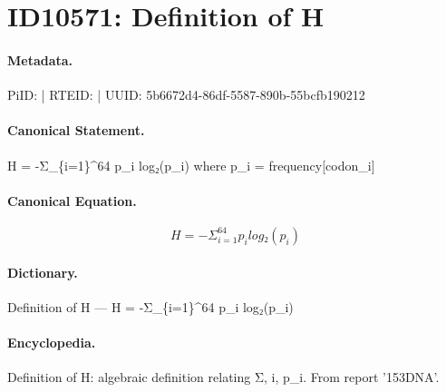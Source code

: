 \section*{ID10571: Definition of H}
\paragraph{Metadata.}
PiID:  | RTEID:  | UUID: 5b6672d4-86df-5587-890b-55bcfb190212

\paragraph{Canonical Statement.}
H = -Σ\_\{i=1\}\textasciicircum{}64 p\_i log₂(p\_i) where p\_i = frequency[codon\_i]

\paragraph{Canonical Equation.}
\[
H = -Σ_{i=1}^64 p_i log₂(p_i)
\]

\paragraph{Dictionary.}
Definition of H — H = -Σ\_\{i=1\}\textasciicircum{}64 p\_i log₂(p\_i)

\paragraph{Encyclopedia.}
Definition of H: algebraic definition relating Σ, i, p\_i. From report '153DNA'.
